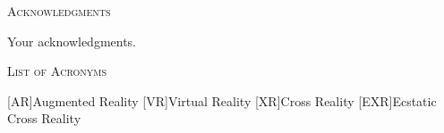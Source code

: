 \documentclass{UIdahoMastersThesis}
\begin{document}
\newpage


 \begin{center}
 	{\LARGE\textsc{Acknowledgments}}
 \end{center}
 
Your acknowledgments.

\newpage


   
   


\tableofcontents
\newpage




\listoffigures
\newpage




\begin{center}
	{\LARGE\textsc{List of Acronyms}}
\end{center}

\begin{acronym}[EXR]  %
	[AR]{Augmented Reality}
	[VR]{Virtual Reality}
	[XR]{Cross Reality}
	[EXR]{Ecstatic Cross Reality}	
\end{acronym}
\end{document}
